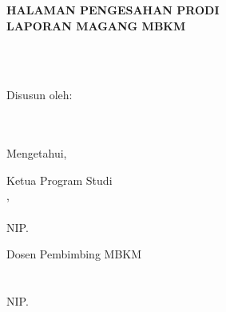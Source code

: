 \newpage


\begin{center}
    \begin{doublespace}
        \textbf{\large \MakeUppercase{Halaman Pengesahan Prodi \\ Laporan Magang MBKM}}
    \end{doublespace}
\end{center}


\begin{center}
    \textbf{\large \MakeUppercase {\normalsize{\judulid}}} \\
    \textbf{\large \MakeUppercase {\normalsize{\tempat}}} \\ [6cm]
\end{center}

\begin{center}
    Disusun oleh:\\
    \textbf{\underline{\penulis}}\\
    \textbf{\nim}\\[3cm]
\end{center}

\begin{center}
    Mengetahui, \\[1cm]
\end{center}
\begin{minipage}{0.45\textwidth}
    Ketua Program Studi\\
    \prodi,\\[2cm]
    \underline{\kaprodi}\\
    NIP. \NIPkaprodi
\end{minipage}%
\hfill
 \begin{minipage}{0.42\textwidth}
    Dosen Pembimbing MBKM \\
    \\[2cm]
    \underline{\pembimbing}\\
    NIP. \NIPpembimbing
\end{minipage}